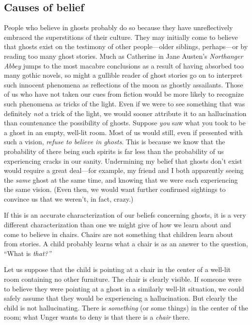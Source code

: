 \documentclass[11pt]{standalone} \newif\ifstandlone \standalonetrue
\begin{document}
\begin{spacing}{1.5}
\subsection{Causes of belief}
\label{unger-cause}
People who believe in ghosts probably do so because they have
unreflectively embraced the superstitions of their culture.  They may
initially come to believe that ghosts exist on the testimony of other
people---older siblings, perhaps---or by reading too many ghost
stories.  Much as Catherine in Jane Austen's {\em Northanger Abbey}
jumps to the most macabre conclusions as a result of having absorbed
too many gothic novels, so might a gullible reader of ghost stories go
on to interpret such innocent phenomena as reflections of the moon as
ghostly assailants.  Those of us who have not taken our cues from
fiction would be more likely to recognize such phenomena as tricks of
the light.  Even if we were to see something that was definitely {\em
  not} a trick of the light, we would sooner attribute it to an
hallucination than countenance the possibility of ghosts.  Suppose
{\em you} saw what you took to be a ghost in an empty, well-lit room.
Most of us would still, even if presented with such a vision, {\em
  refuse to believe in ghosts}.  This is because we know that the
probability of there being such spirits is far less than the
probability of us experiencing cracks in our sanity.  Undermining my
belief that ghosts don't exist would require a great deal---for
example, my friend and I both apparently seeing the {\em same} ghost
at the same time, and knowing that we were each experiencing the same
vision.  (Even then, we would want further confirmed sightings to
convince us that we weren't, in fact, crazy.)

If this is an accurate characterization of our beliefs concerning
ghosts, it is a very different characterization than one we might give
of how we learn about and come to believe in chairs.  Chairs are not
something that children learn about from stories.  A child probably
learns what a chair is as an answer to the question, ``What is {\em
  that?}\,''  

Let us suppose that the child is pointing at a chair in the center of
a well-lit room containing no other furniture.  The chair is clearly
visible.  If someone were to believe they were pointing at a ghost in
a similarly well-lit situation, we could safely assume that they would
be experiencing a hallucination.  But clearly the child is not
hallucinating.  There is {\em something} (or some things) in the
center of the room; what Unger wants to deny is that there is a {\em
  chair} there.


\end{spacing}
\end{document}
